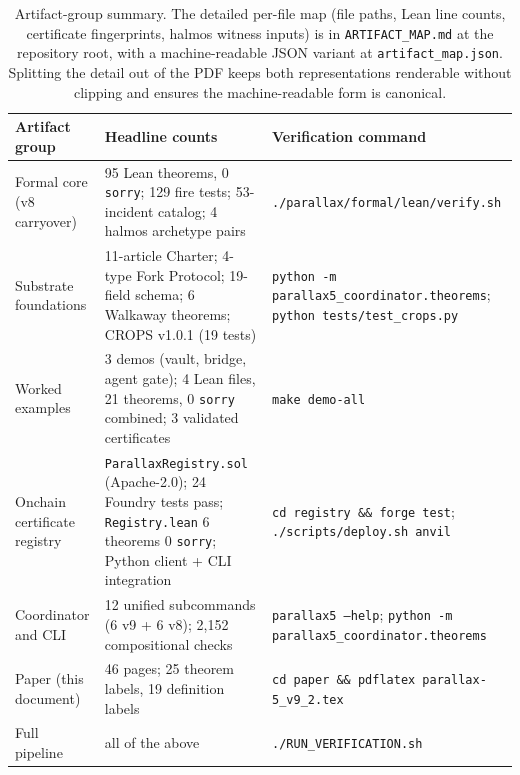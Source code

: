 \documentclass[11pt,a4paper]{article}
\renewcommand{\arraystretch}{1.15}
\renewcommand{\arraystretch}{1.15}
\begin{document}
\begin{table}[h]
\centering
\small
\renewcommand{\arraystretch}{1.2}
\begin{tabular}{p{4.2cm}p{4.5cm}p{5.5cm}}
\toprule
\textbf{Artifact group} & \textbf{Headline counts} & \textbf{Verification command} \\
\midrule
Formal core (v8 carryover) & 95 Lean theorems, 0 \texttt{sorry}; 129 fire tests; 53-incident catalog; 4 halmos archetype pairs & \texttt{./parallax/formal/lean/verify.sh} \\
\addlinespace
Substrate foundations & 11-article Charter; 4-type Fork Protocol; 19-field schema; 6 Walkaway theorems; CROPS v1.0.1 (19 tests) & \texttt{python -m parallax5\_coordinator.theorems}; \texttt{python tests/test\_crops.py} \\
\addlinespace
Worked examples & 3 demos (vault, bridge, agent gate); 4 Lean files, 21 theorems, 0 \texttt{sorry} combined; 3 validated certificates & \texttt{make demo-all} \\
\addlinespace
Onchain certificate registry & \texttt{ParallaxRegistry.sol} (Apache-2.0); 24 Foundry tests pass; \texttt{Registry.lean} 6 theorems 0 \texttt{sorry}; Python client + CLI integration & \texttt{cd registry \&\& forge test}; \texttt{./scripts/deploy.sh anvil} \\
\addlinespace
Coordinator and CLI & 12 unified subcommands (6 v9 + 6 v8); 2{,}152 compositional checks & \texttt{parallax5 --help}; \texttt{python -m parallax5\_coordinator.theorems} \\
\addlinespace
Paper (this document) & 46 pages; 25 theorem labels, 19 definition labels & \texttt{cd paper \&\& pdflatex parallax-5\_v9\_2.tex} \\
\addlinespace
Full pipeline & all of the above & \texttt{./RUN\_VERIFICATION.sh} \\
\bottomrule
\end{tabular}
\caption{Artifact-group summary. The detailed per-file map (file paths, Lean line counts, certificate fingerprints, halmos witness inputs) is in \texttt{ARTIFACT\_MAP.md} at the repository root, with a machine-readable JSON variant at \texttt{artifact\_map.json}. Splitting the detail out of the PDF keeps both representations renderable without clipping and ensures the machine-readable form is canonical.}\label{tab:artifact-summary}
\end{table}
\end{document}
